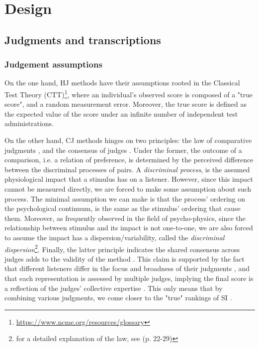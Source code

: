 \section{Design}
%
\subsection{Judgments and transcriptions}
%
\subsubsection{Judgement assumptions}
%
On the one hand, HJ methods have their assumptions rooted in the Classical Test Theory (CTT)\footnote{\url{https://www.ncme.org/resources/glossary}}, where an individual's observed score is composed of a "true score", and a random measurement error. Moreover, the true score is defined as the expected value of the score under an infinite number of independent test administrations.

On the other hand, CJ methods hinges on two principles: the law of comparative judgments \citep{Thurstone_1927}, and the consensus of judges \citep{Lesterhuis_2018}. Under the former, the outcome of a comparison, i.e. a relation of preference, is determined by the perceived difference between the discriminal processes of pairs. A \textit{discriminal process}, is the assumed physiological impact that a stimulus has on a listener. However, since this impact cannot be measured directly, we are forced to make some assumption about such process. The minimal assumption we can make is that the process' ordering on the psychological continuum, is the same as the stimulus' ordering that cause them. Moreover, as frequently observed in the field of psycho-physics, since the relationship between stimulus and its impact is not one-to-one, we are also forced to assume the impact has a dispersion/variability, called the \textit{discriminal dispersion}\footnote{for a detailed explanation of the law, see \citet{Thurstone_1927, Verhavert_2018} (p. 22-29)}. Finally, the latter principle indicates the shared consensus across judges adds to the validity of the method \citep{Lesterhuis_2018}. This claim is supported by the fact that different listeners differ in the focus and broadness of their judgments \citep{Lesterhuis_2018}, and that each representation is assessed by multiple judges, implying the final score is a reflection of the judges’ collective expertise \citep{Pollitt_2012b}. This only means that by combining various judgments, we come closer to the "true" rankings of SI \citep{Lee_et_al_2014}.
%
%
